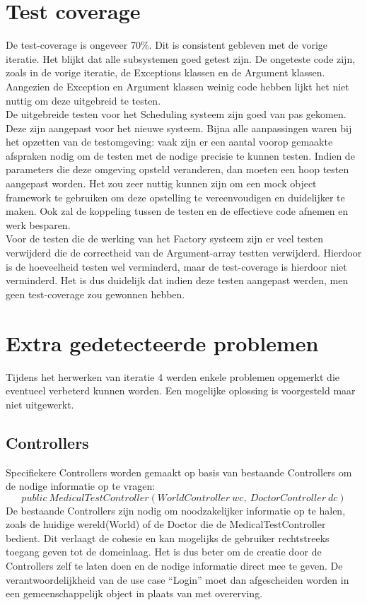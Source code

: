 \section{Test coverage}
De test-coverage is ongeveer 70\%. Dit is consistent gebleven met de vorige iteratie. Het blijkt dat alle subsystemen goed getest zijn. 
De ongeteste code zijn, zoals in de vorige iteratie, de Exceptions klassen en de Argument klassen. 
Aangezien de Exception en Argument klassen weinig code hebben lijkt het niet nuttig om deze uitgebreid te testen.\\

De uitgebreide testen voor het Scheduling systeem zijn goed van pas gekomen. 
Deze zijn aangepast voor het nieuwe systeem. 
Bijna alle aanpassingen waren bij het opzetten van de testomgeving: vaak zijn er een aantal voorop gemaakte afspraken nodig om de testen met de nodige precisie te kunnen testen.
Indien de parameters die deze omgeving opsteld veranderen, dan moeten een hoop testen aangepast worden. 
Het zou zeer nuttig kunnen zijn om een mock object framework te gebruiken om deze opstelling te vereenvoudigen en duidelijker te maken. 
Ook zal de koppeling tussen de testen en de effectieve code afnemen en werk besparen.\\

Voor de testen die de werking van het Factory systeem zijn er veel testen verwijderd die de correctheid van de Argument-array testten verwijderd. 
Hierdoor is de hoeveelheid testen wel verminderd, maar de test-coverage is hierdoor niet verminderd. 
Het is dus duidelijk dat indien deze testen aangepast werden, men geen test-coverage zou gewonnen hebben.

\section{Extra gedetecteerde problemen}
Tijdens het herwerken van iteratie 4 werden enkele problemen opgemerkt die eventueel verbeterd kunnen worden. 
Een mogelijke oplossing is voorgesteld maar niet uitgewerkt.

\subsection{Controllers}
Specifiekere Controllers worden gemaakt op basis van bestaande Controllers om de nodige informatie op te vragen: 
\[public\ MedicalTestController(WorldController\ wc,\ DoctorController\ dc)\]
De bestaande Controllers zijn nodig om noodzakelijker informatie op te halen, zoals de huidige wereld(World) of de Doctor die de MedicalTestController bedient. 
Dit verlaagt de cohesie en kan mogelijks de gebruiker rechtstreeks toegang geven tot de domeinlaag.
Het is dus beter om de creatie door de Controllers zelf te laten doen en de nodige informatie direct mee te geven. 
De verantwoordelijkheid van de use case ``Login'' moet dan afgescheiden worden in een gemeenschappelijk object in plaats van met overerving.

